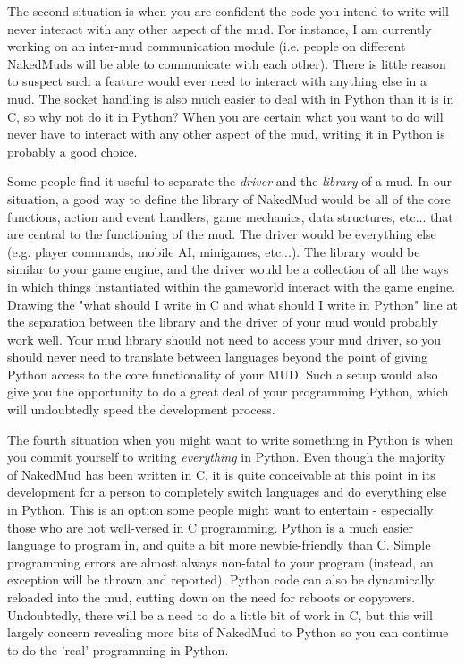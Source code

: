 \documentclass[12pt]{article}
\begin{document}
The second situation is when you are confident the code you intend to write will never interact with any other aspect of the mud. For instance, I am currently working on an inter-mud communication module (i.e. people on different NakedMuds will be able to communicate with each other). There is little reason to suspect such a feature would ever need to interact with anything else in a mud. The socket handling is also much easier to deal with in Python than it is in C, so  why not do it in Python? When you are certain what you want to do will never have to interact with any other aspect of the mud, writing it in Python is probably a good choice.

Some people find it useful to separate the {\it driver} and the {\it library} of a mud. In our situation, a good way to define the library of NakedMud would be all of the core functions, action and event handlers, game mechanics, data structures, etc... that are central to the functioning of the mud. The driver would be everything else (e.g. player commands, mobile AI, minigames, etc...). The library would be similar to your game engine, and the driver would be a collection of all the ways in which things instantiated within the gameworld interact with the game engine. Drawing the "what should I write in C and what should I write in Python" line at the separation between the library and the driver of your mud would probably work well. Your mud library should not need to access your mud driver, so you should never need to translate between languages beyond the point of giving Python access to the core functionality of your MUD. Such a setup would also give you the opportunity to do a great deal of your programming Python, which will undoubtedly speed the development process.

The fourth situation when you might want to write something in Python is when you commit yourself to writing {\it everything} in Python. Even though the majority of NakedMud has been written in C, it is quite conceivable at this point in its development for a person to completely switch languages and do everything else in Python. This is an option some people might want to entertain - especially those who are not well-versed in C programming. Python is a much easier language to program in, and quite a bit more newbie-friendly than C. Simple programming errors are almost always non-fatal to your program (instead, an exception will be thrown and reported). Python code can also be dynamically reloaded into the mud, cutting down on the need for reboots or copyovers. Undoubtedly, there will be a need to do a little bit of work in C, but this will largely concern revealing more bits of NakedMud to Python so you can continue to do the 'real' programming in Python.
\end{document}
